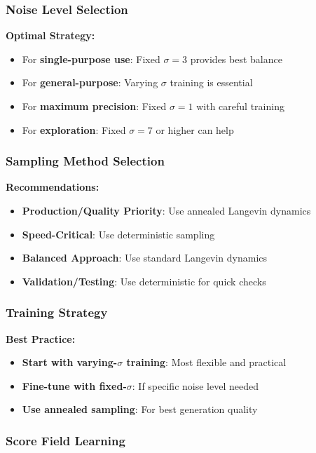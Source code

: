 \documentclass[journal]{IEEEtran}
\begin{document}
\subsubsection{Noise Level Selection}

\textbf{Optimal Strategy:}
\begin{itemize}
    \item For \textbf{single-purpose use}: Fixed $\sigma = 3$ provides best balance
    \item For \textbf{general-purpose}: Varying $\sigma$ training is essential
    \item For \textbf{maximum precision}: Fixed $\sigma = 1$ with careful training
    \item For \textbf{exploration}: Fixed $\sigma = 7$ or higher can help
\end{itemize}

\subsubsection{Sampling Method Selection}

\textbf{Recommendations:}
\begin{itemize}
    \item \textbf{Production/Quality Priority}: Use annealed Langevin dynamics
    \item \textbf{Speed-Critical}: Use deterministic sampling
    \item \textbf{Balanced Approach}: Use standard Langevin dynamics
    \item \textbf{Validation/Testing}: Use deterministic for quick checks
\end{itemize}

\subsubsection{Training Strategy}

\textbf{Best Practice:}
\begin{itemize}
    \item \textbf{Start with varying-$\sigma$ training}: Most flexible and practical
    \item \textbf{Fine-tune with fixed-$\sigma$}: If specific noise level needed
    \item \textbf{Use annealed sampling}: For best generation quality
\end{itemize}

\subsubsection{Score Field Learning}
\end{document}

